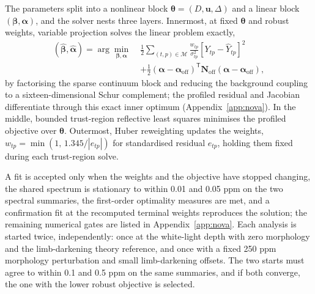 
The parameters split into a nonlinear block
$\bm{\theta}=(D,\bm{u},\Delta)$ and a linear block
$(\bm{\beta},\bm{\alpha})$, and the solver nests three layers. Innermost,
at fixed $\bm{\theta}$ and robust weights, variable projection
\citep{GolubPereyra1973} solves the linear problem exactly,
\begin{equation}
\begin{split}
 (\widehat{\bm{\beta}},\widehat{\bm{\alpha}})=
 \arg\min_{\bm{\beta},\bm{\alpha}}\;
 &\frac{1}{2}\sum_{(t,p)\in\mathcal{M}}\frac{w_{tp}}{\sigma_{tp}^2}
 \left[Y_{tp}-\widehat Y_{tp}\right]^2 \\
 &+\frac{1}{2}(\bm{\alpha}-\bm{\alpha}_{\mathrm{off}})^{\mathsf T}
   \bm{N}_{\mathrm{off}}(\bm{\alpha}-\bm{\alpha}_{\mathrm{off}}),
\end{split}
 \label{eq:varpro}
\end{equation}
by factorising the sparse continuum block and reducing the background
coupling to a sixteen-dimensional Schur complement; the profiled residual
and Jacobian differentiate through this exact inner optimum
(Appendix~\ref{app:nova}). In the middle, bounded trust-region reflective
least squares \citep{BranchColemanLi1999} minimises the profiled
objective over $\bm{\theta}$. Outermost, Huber reweighting
\citep{Huber1964} updates the weights,
$w_{tp}=\min(1,\,1.345/|e_{tp}|)$ for standardised residual $e_{tp}$,
holding them fixed during each trust-region solve.

A fit is accepted only when the weights and the objective have stopped
changing, the shared spectrum is stationary to within 0.01 and 0.05 ppm
on the two spectral summaries, the first-order optimality measures are
met, and a confirmation fit at the recomputed terminal weights
reproduces the solution; the remaining numerical gates are listed in
Appendix~\ref{app:nova}. Each analysis is started twice, independently:
once at the white-light depth with zero morphology and the
limb-darkening theory reference, and once with a fixed 250 ppm
morphology perturbation and small limb-darkening offsets. The two starts
must agree to within 0.1 and 0.5 ppm on the same summaries, and if both
converge, the one with the lower robust objective is selected.

